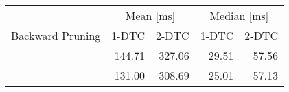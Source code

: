 \begin{tabular}{crrrr}
	\toprule
	                 & \multicolumn{2}{c}{Mean [\si{\milli\second}]} & \multicolumn{2}{c}{Median [\si{\milli\second}]}                 \\
	Backward Pruning & 1-DTC                                         & 2-DTC                                           & 1-DTC & 2-DTC \\
	\midrule
	\xmark           & 144.71                                             & 327.06                                               & 29.51     & 57.56     \\
	\cmark           & 131.00                                             & 308.69                                               & 25.01     & 57.13     \\
	\bottomrule
\end{tabular}
